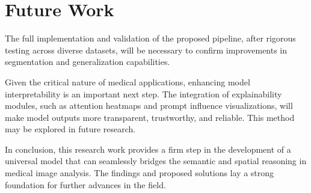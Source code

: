 \documentclass{cls/iutbscthesis}
\begin{document}
\par
\section{Future Work}

The full implementation and validation of the proposed pipeline, after rigorous testing across diverse datasets, will be necessary to confirm improvements in segmentation and generalization capabilities.
\par
Given the critical nature of medical applications, enhancing model interpretability is an important next step. The integration of explainability modules, such as attention heatmaps and prompt influence visualizations, will make model outputs more transparent, trustworthy, and reliable. This method may be explored in future research.
\par
In conclusion, this research work provides a firm step in the development of a universal model that can seamlessly bridges the semantic and spatial reasoning in medical image analysis. The findings and proposed solutions lay a strong foundation for further advances in the field.




\end{document}

